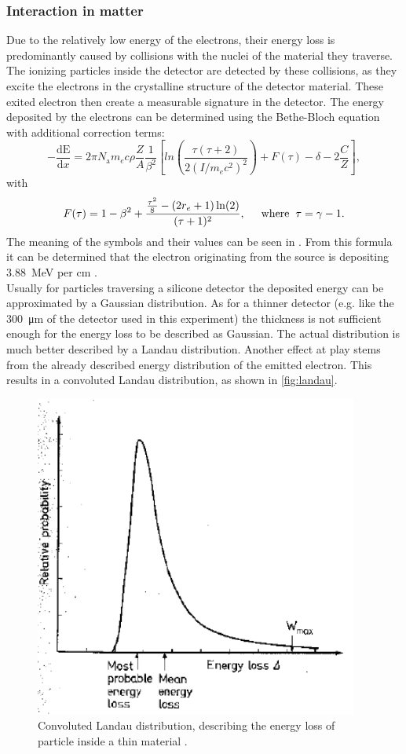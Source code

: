 \subsubsection{Interaction in matter}
Due to the relatively low energy of the electrons, their energy loss is predominantly caused by collisions with the nuclei of the material they traverse. The ionizing particles inside the detector are detected by these collisions, as they excite the electrons in the crystalline structure of the detector material. These exited electron then create a measurable signature in the detector. The energy deposited by the electrons can be determined using the Bethe-Bloch equation with additional correction terms:
\begin{equation*}
	-\frac{\mathrm{dE}}{\mathrm{d}x} = 2\pi N_{\mathrm{a}} m_e c \rho \frac{Z}{A} \frac{1}{\beta^2} \left[ln\left(\frac{\tau(\tau+2)}{2(I/m_ec^2)^2}\right)+F(\tau) - \delta - 2\frac{C}{Z}\right],
\end{equation*}
with 
\begin{equation*}
	F(\tau) = 1 - \beta^2 + \frac{\frac{\tau^2}{8}-(2r_e +1 )\ln(2)}{(\tau+1)^2}, \hspace{0.5cm} \mathrm{where}\hspace{0.2cm} \tau = \gamma-1.
\end{equation*}
The meaning of the symbols and their values can be seen in \cite{V15}.
From this formula it can be determined that the electron originating from the  source is depositing \qty{3.88}{\mega\eV} per \unit{\centi\meter} \cite{V15}.\\

Usually for particles traversing a silicone detector the deposited energy can be approximated by a Gaussian distribution. As for a thinner detector (e.g. like the \qty{300}{\micro\meter} of the detector used in this experiment) the thickness is not sufficient enough for the energy loss to be described as Gaussian. The actual distribution is much better described by a Landau distribution. Another effect at play stems from the already described energy distribution of the emitted electron. This results in a convoluted Landau distribution, as shown in \autoref{fig:landau}.


\begin{figure}[H]
	\centering
	\includegraphics[width=0.45\linewidth]{Assets/landau}
	\caption{Convoluted Landau distribution, describing the energy loss of particle inside a thin material \cite{V15}.}
	\label{fig:landau}
\end{figure}


